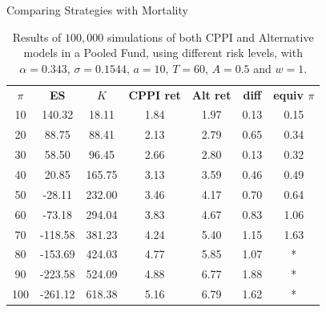 \documentclass[10pt]{beamer}
\begin{document}
\begin{frame}[fragile]{Comparing Strategies with Mortality}
  \begin{table}[h]
    \centering
    \caption{Results of $100,000$ simulations of both CPPI and Alternative models in a Pooled Fund, using different risk levels, with $\alpha = 0.343$, $\sigma = 0.1544$, $a = 10$, $T = 60$, $A = 0.5$ and $w = 1$.}
    \label{tab:cppi_alt_mort}
    \begin{tabular}{ccccccc}
    \textbf{$\pi$} & \textbf{ES } & \textbf{$K$} & \textbf{CPPI ret} & \textbf{Alt ret} & \textbf{diff}  & \textbf{equiv $\pi$}\\
    10  & 140.32  & 18.11 & 1.84 & 1.97 & 0.13 & 0.15 \\
    20  & 88.75  & 88.41 & 2.13 & 2.79 & 0.65 & 0.34 \\
    30  & 58.50  & 96.45 & 2.66 & 2.80 & 0.13 & 0.32 \\
    40  & 20.85  & 165.75  & 3.13 & 3.59 & 0.46 & 0.49 \\
    50  & -28.11 & 232.00  & 3.46 & 4.17 & 0.70 & 0.64 \\
    60  & -73.18 & 294.04 & 3.83 & 4.67 & 0.83 & 1.06 \\
    70  & -118.58 & 381.23 & 4.24 & 5.40 & 1.15 & 1.63 \\
    80  & -153.69 & 424.03 & 4.77 & 5.85  & 1.07 & *                 \\
    90  & -223.58 & 524.09 & 4.88 & 6.77 & 1.88 & *                 \\
    100 & -261.12   & 618.38 & 5.16 & 6.79 & 1.62 & *

  \end{tabular}
\end{table}
\end{frame}
\end{document}
